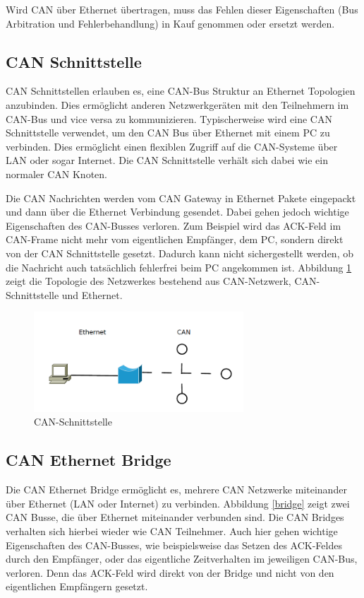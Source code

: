 Wird CAN über Ethernet übertragen, muss das Fehlen dieser Eigenschaften (Bus
Arbitration und Fehlerbehandlung) in Kauf genommen oder ersetzt werden.

\subsection{CAN Schnittstelle}
\label{l:interf}

CAN Schnittstellen erlauben es, eine CAN-Bus Struktur an Ethernet Topologien anzubinden. 
Dies ermöglicht anderen Netzwerkgeräten mit den Teilnehmern im CAN-Bus und vice versa 
zu kommunizieren. Typischerweise wird eine CAN Schnittstelle verwendet, um den CAN Bus 
über Ethernet mit einem PC zu verbinden. Dies ermöglicht einen flexiblen Zugriff auf die 
CAN-Systeme über LAN oder sogar Internet. Die CAN Schnittstelle verhält sich dabei wie 
ein normaler CAN Knoten. \citep{STE}

Die CAN Nachrichten werden vom CAN Gateway in Ethernet Pakete eingepackt und dann 
über die Ethernet Verbindung gesendet. Dabei gehen jedoch wichtige Eigenschaften des 
CAN-Busses verloren. Zum Beispiel wird das ACK-Feld im CAN-Frame nicht mehr vom 
eigentlichen Empfänger, dem PC, sondern direkt von der CAN Schnittstelle gesetzt. Dadurch 
kann nicht sichergestellt werden, ob die Nachricht auch tatsächlich fehlerfrei beim PC angekommen ist.
Abbildung \ref{gateway} zeigt die Topologie des Netzwerkes bestehend aus CAN-Netzwerk, 
CAN-Schnittstelle und Ethernet.

\begin{figure}[h] 
\centering
\includegraphics[width=0.7\textwidth]{figures/can_gateway}
\caption{CAN-Schnittstelle} 
\label{gateway}
\end{figure} 

\subsection{CAN Ethernet Bridge}
\label{l:bridge}

Die CAN Ethernet Bridge ermöglicht es, mehrere CAN Netzwerke miteinander über Ethernet 
(LAN oder Internet) zu verbinden. Abbildung \ref{bridge} zeigt zwei CAN Busse, die über 
Ethernet miteinander verbunden sind. Die CAN Bridges verhalten sich hierbei wieder wie 
CAN Teilnehmer. Auch hier gehen wichtige Eigenschaften des CAN-Busses, wie beispielsweise 
das Setzen des ACK-Feldes durch den Empfänger, oder das eigentliche Zeitverhalten im 
jeweiligen CAN-Bus, verloren. Denn das ACK-Feld wird direkt von der Bridge und nicht von 
den eigentlichen Empfängern gesetzt.

